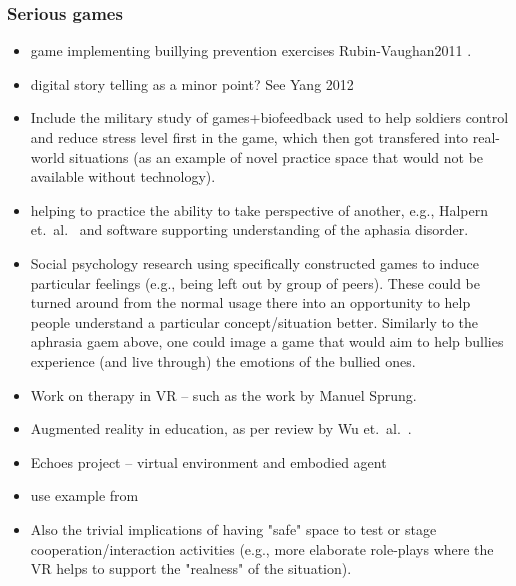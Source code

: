 \documentclass[prodmode,acmtochi]{acmsmall}
\newcommand{\todo}[1]{\textrm{\textrm{\textcolor{LightBlue}{[[#1]]}}}}
\begin{document}
\subsubsection{Serious games}
\begin{itemize}
                        \item game implementing buillying prevention exercises Rubin-Vaughan2011 \cite{Rubin-Vaughan2011}. 
                \item digital story telling as a minor point? See Yang 2012 \cite{Yang2012}
                        \item Include the military study of games+biofeedback used to help soldiers control and reduce stress level first in the game, which then got transfered into real-world situations \cite{Bouchard2012} (as an example of novel practice space that would not be available without technology). 
                        \item helping to practice the ability to take perspective of another, e.g., Halpern et.~al.~ \cite{Hailpern2011} and software supporting understanding of the aphasia disorder.
                        \item Social psychology research using specifically constructed games to induce particular feelings (e.g., being left out by group of peers). These could be turned around from the normal usage there into an opportunity to help people understand a particular concept/situation better. Similarly to the aphrasia gaem above, one could image a game that would aim to help bullies experience (and live through) the emotions of the bullied ones. 
 
\end{itemize}

\begin{itemize}
                        \item Work on therapy in VR -- such as the work by Manuel Sprung. 

                        \item Augmented reality in education, as per review by Wu et.~al.~\cite{Wu2012}.
                        \item Echoes project \cite{Porayska-Pomsta2011} -- virtual environment and embodied agent
                        \item use example from \cite{Core2006}
                        \item Also the trivial implications of having "safe" space to test or stage cooperation/interaction activities (e.g., more elaborate role-plays where the VR helps to support the "realness" of the situation). 
\end{itemize}
\fi
\end{document}
